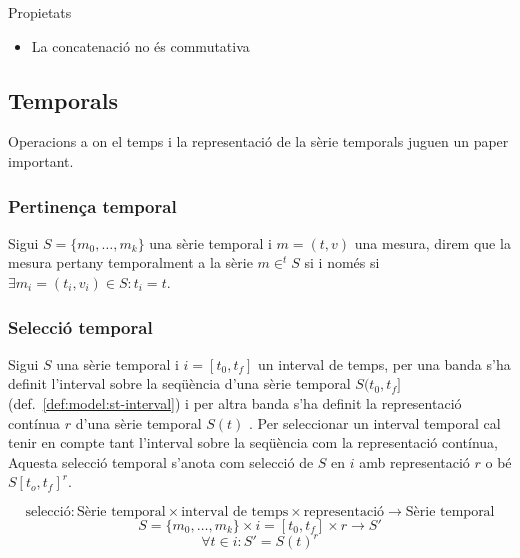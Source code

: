 Propietats
\begin{itemize}
\item La concatenació no és commutativa
\end{itemize}




\subsection{Temporals}

Operacions a on el temps i la representació de la sèrie temporals
juguen un paper important.


\subsubsection{Pertinença temporal}

\begin{definition}
  Sigui $S=\{m_0, \dotsc, m_{k}\}$ una sèrie temporal i $m=(t,v)$ una
  mesura, direm que la mesura pertany temporalment a la sèrie 
  $m\in^t S$ si i només si $\exists m_i=(t_i,v_i)\in S: t_i=t$.
\end{definition}





\subsubsection{Selecció temporal}

Sigui $S$ una sèrie temporal i $i=[t_0,t_f]$ un interval de temps,
per una banda s'ha definit l'interval sobre la seqüència d'una sèrie temporal $S(t_0,t_f]$ (def.~\ref{def:model:st-interval})  i per altra banda s'ha definit la representació contínua $r$ d'una sèrie temporal $S(t)$ .
Per seleccionar un interval temporal cal tenir en compte tant l'interval sobre la seqüència com la representació contínua, Aquesta selecció temporal s'anota com selecció de $S$ en $i$ amb representació $r$ o bé $S[t_o,t_f]^r$. 

\begin{definition}
  \[
  \text{selecció}: \text{Sèrie temporal} \times \text{interval de
    temps} \times \text{representació} \longrightarrow \text{Sèrie
    temporal}
  \]
  \[
  S = \{m_0 , \ldots , m_k\}  \times i = [t_0,t_f] \times r \longrightarrow S'
  \]
  \[
  \forall  t \in i: S' = S(t)^r 
  \] 
\end{definition}

